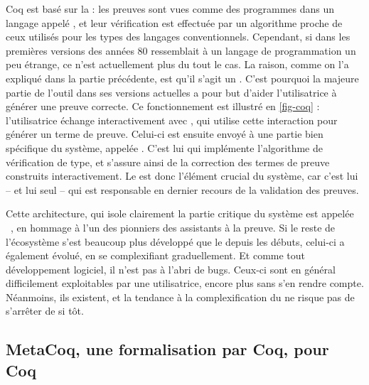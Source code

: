 Coq est basé sur la  : les preuves sont vues comme des programmes dans un langage appelé ,
et leur vérification est effectuée par un algorithme proche
de ceux utilisés pour les types des langages conventionnels.
Cependant, si dans les premières versions des années 80  ressemblait à un langage de programmation un peu étrange, ce n’est actuellement plus du tout le cas.
La raison, comme on l’a expliqué dans la partie précédente,
est qu’il s’agit un .
C’est pourquoi la majeure partie de l’outil dans ses versions actuelles a pour but d’aider l’utilisatrice à générer une preuve correcte.
Ce fonctionnement est illustré en \cref{fig-coq} : l’utilisatrice échange interactivement avec , qui utilise cette interaction pour générer un terme de preuve. Celui-ci est ensuite envoyé à une partie bien spécifique du système, appelée .
C’est lui qui implémente l’algorithme de vérification de type, et s’assure ainsi de la correction des termes de preuve construits interactivement.
Le  est donc l’élément crucial du système, car c’est lui – et lui seul – qui est responsable en dernier recours de la validation des preuves.

Cette architecture, qui isole clairement la partie critique du système
est appelée ~, en 
hommage à l’un des pionniers des assistants à la preuve.
Si le reste de l’écosystème s’est beaucoup plus développé que le  depuis les débuts, celui-ci a également évolué, en se complexifiant graduellement.
Et comme tout développement logiciel, il n’est pas à l’abri de bugs.
Ceux-ci sont en général difficilement exploitables par une utilisatrice,
encore plus sans s’en rendre compte.
Néanmoins, ils existent,
et la tendance à la complexification du  ne risque pas de s’arrêter de si tôt.

\subsection[MetaCoq]{MetaCoq, une formalisation par Coq, pour Coq}
\label{sec:intro-metacoq}


